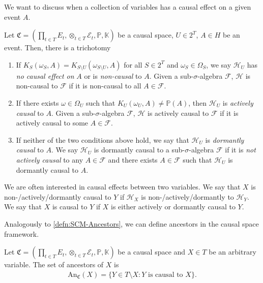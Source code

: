 \documentclass[../main.tex]{subfiles}
\begin{document}
    
    We want to discuss when a collection of variables has a causal effect on a given event ${A}$.  
    \begin{defn}
    \label{defn:Effects-in-causal-spaces}
        Let ${\mathfrak{C}=(\prod_{t\in T} E_t, \otimes_{t\in T} \mathcal{E}_t, \mathbb{P}, \mathbb{K})}$ be a causal space, ${U\in 2^T}$, ${A\in H}$ be an event. Then, there is a trichotomy
        \begin{enumerate}
            \item If ${K_S(\omega_S, A)=K_{S\setminus U}(\omega_{S\setminus U},A)}$ for all ${S\in 2^T}$ and ${\omega_S\in\Omega_S}$, we say ${\mathcal{H}_U}$ has \emph{no causal effect on} ${A}$ or is \emph{non-causal} to ${A}$. Given a sub-${\sigma}$-algebra ${\mathcal{F}}$, ${\mathcal{H}}$ is non-causal to ${\mathcal{F}}$ if it is  non-causal to all ${A\in \mathcal{F}}$.    
            \item If there exists ${\omega\in \Omega_U}$ such that ${K_U(\omega_U,A)\neq \mathbb{P}(A)}$, then ${\mathcal{H}_U}$ is \emph{actively causal} to ${A}$. Given a sub-${\sigma}$-algebra ${\mathcal{F}}$, ${\mathcal{H}}$ is actively causal to ${\mathcal{F}}$ if it is actively causal to some ${A\in \mathcal{F}}$.   
            \item If neither of the two conditions above hold, we say that ${\mathcal{H}_U}$ is \emph{dormantly causal} to ${A}$. We say ${\mathcal{H}_U}$ is dormantly causal to a sub-${\sigma}$-algebra ${\mathcal{F}}$ if it is \emph{not actively causal} to any ${A\in \mathcal{F}}$ and there exists ${A\in \mathcal{F}}$ such that ${\mathcal{H}_U}$ is dormantly causal to ${A}$.    
        \end{enumerate}
    \end{defn}
    \begin{nota}
        We are often interested in causal effects between two variables. We say that ${X}$ is non-/actively/dormantly causal to ${Y}$ if ${\mathcal{H}_X}$ is non-/actively/dormantly to ${\mathcal{H}_Y}$. We say that ${X}$ is causal to ${Y}$ if ${X}$ is either actively or dormantly causal to ${Y}$.
    \end{nota}
    Analogously to \autoref{defn:SCM-Ancestors}, we can define ancestors in the causal space framework. 
    \begin{defn}[Ancestors]
    \label{defn:Ancestors}
        Let ${\mathfrak{C}=(\prod_{t\in T} E_t, \otimes_{t\in T} \mathcal{E}_t, \mathbb{P}, \mathbb{K})}$ be a causal space and ${X\in T}$ be an arbitrary variable. The set of ancestors of ${X}$ is
        \begin{align*}
            \text{An}_{\mathfrak{C}}(X) = \{Y\in T\setminus X: Y \text{ is causal to } X\}.
        \end{align*}
    \end{defn}
    
\end{document}
